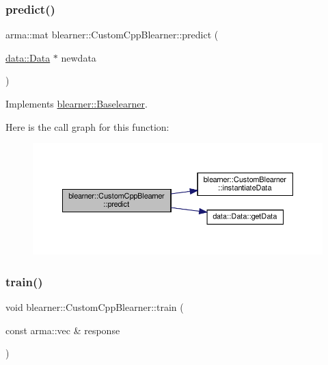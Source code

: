 \subsubsection{\texorpdfstring{predict()}{predict()}\hspace{0.1cm}{\footnotesize\ttfamily [2/2]}}
{\footnotesize\ttfamily arma\+::mat blearner\+::\+Custom\+Cpp\+Blearner\+::predict (\begin{DoxyParamCaption}\item[{\hyperlink{classdata_1_1_data}{data\+::\+Data} $\ast$}]{newdata }\end{DoxyParamCaption})\hspace{0.3cm}{\ttfamily [virtual]}}



Implements \hyperlink{classblearner_1_1_baselearner_ae2ef5e018783578e02b3b5a33fa94eae}{blearner\+::\+Baselearner}.

Here is the call graph for this function\+:\nopagebreak
\begin{figure}[H]
\begin{center}
\leavevmode
\includegraphics[width=350pt]{classblearner_1_1_custom_cpp_blearner_af2326171640e94c3a00f813781710208_cgraph}
\end{center}
\end{figure}
\mbox{\label{classblearner_1_1_custom_cpp_blearner_aa71b777d7092a3d9b47a9bed125eb0f9}} 
\subsubsection{\texorpdfstring{train()}{train()}}
{\footnotesize\ttfamily void blearner\+::\+Custom\+Cpp\+Blearner\+::train (\begin{DoxyParamCaption}\item[{const arma\+::vec \&}]{response }\end{DoxyParamCaption})\hspace{0.3cm}{\ttfamily [virtual]}}



